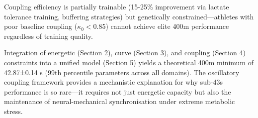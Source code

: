 Coupling efficiency is partially trainable (15-25\% improvement via lactate tolerance training, buffering strategies) but genetically constrained—athletes with poor baseline coupling ($\kappa_0 < 0.85$) cannot achieve elite 400m performance regardless of training quality.

Integration of energetic (Section 2), curve (Section 3), and coupling (Section 4) constraints into a unified model (Section 5) yields a theoretical 400m minimum of 42.87±0.14 s (99th percentile parameters across all domains). The oscillatory coupling framework provides a mechanistic explanation for why sub-43s performance is so rare—it requires not just energetic capacity but also the maintenance of neural-mechanical synchronisation under extreme metabolic stress.
